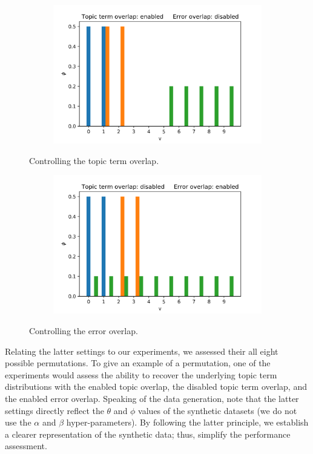 \documentclass{mpaper}
\begin{document}
\begin{figure}
  \begin{subfigure}[b]{0.48\textwidth}
    \includegraphics[width=\linewidth]{phi_topic-ol_error-nonol.png}
  \end{subfigure}%
   \caption{Controlling the topic term overlap.}
  \label{fig:ol_terms}

  \begin{subfigure}[b]{0.48\textwidth}
    \includegraphics[width=\linewidth]{phi_topic-nonol_error-ol.png}
  \end{subfigure}%
   \caption{Controlling the error overlap.}
  \label{fig:ol_error}
\end{figure}

\par Relating the latter settings to our experiments, we assessed their all eight possible permutations. To give an example of a permutation, one of the experiments would assess the ability to recover the underlying topic term distributions with the enabled topic overlap, the disabled topic term overlap, and the enabled error overlap. Speaking of the data generation, note that the latter settings directly reflect the $\theta$ and $\phi$ values of the synthetic datasets (we do not use the $\alpha$ and $\beta$ hyper-parameters). By following the latter principle, we establish a clearer representation of the synthetic data; thus, simplify the performance assessment.
\end{document}
